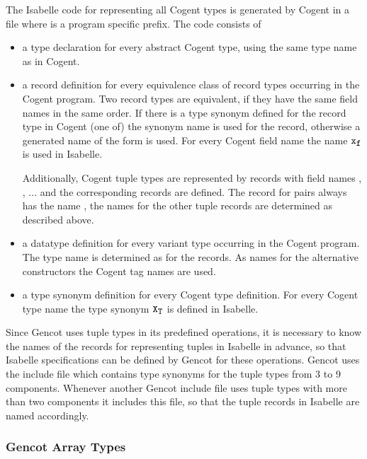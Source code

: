 The Isabelle code for representing all Cogent types is generated by Cogent in a file 
where  is a program specific prefix. The code consists of
\begin{itemize}

\item a type declaration for every abstract Cogent type, using the same type name as in Cogent.

\item a record definition for every equivalence class of record types occurring in the Cogent program. Two record
types are equivalent, if they have the same field names in the same order. If there is a type synonym defined
for the record type in Cogent (one of) the synonym name is used for the record, otherwise a generated name of
the form  is used. For every Cogent field name  the name $\textnormal{\texttt{x}}_{\textnormal{\texttt{\small{f}}}}$ is used in Isabelle.

Additionally, Cogent tuple types are represented by records with field names
, , ... and the corresponding records are defined. The record for pairs always has the name
, the names for the other tuple records are determined as described above.

\item a datatype definition for every variant type occurring in the Cogent program. The type name is determined 
as for the records. As names for the alternative constructors the Cogent tag names are used.

\item a type synonym definition for every Cogent type definition. For every Cogent type name  the
type synonym $\textnormal{\texttt{X}}_{\textnormal{\texttt{\small{T}}}}$ is defined in Isabelle.

\end{itemize}

Since Gencot uses tuple types in its predefined operations, it is necessary to know the names of the records for
representing tuples in Isabelle in advance, so that Isabelle specifications can be defined by Gencot for these 
operations. Gencot uses the include file  which contains type synonyms  for 
the tuple types from 3 to 9 components. Whenever another Gencot include file uses tuple types with more than 
two components it includes this file, so that the tuple records in Isabelle are named accordingly.

\subsubsection{Gencot Array Types}

